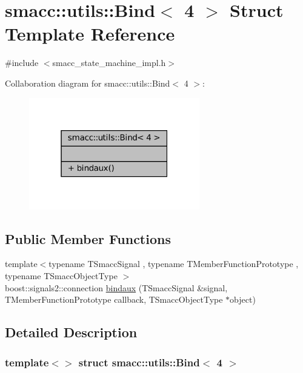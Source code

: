 \hypertarget{structsmacc_1_1utils_1_1Bind_3_014_01_4}{}\section{smacc\+:\+:utils\+:\+:Bind$<$ 4 $>$ Struct Template Reference}
\label{structsmacc_1_1utils_1_1Bind_3_014_01_4}


{\ttfamily \#include $<$smacc\+\_\+state\+\_\+machine\+\_\+impl.\+h$>$}



Collaboration diagram for smacc\+:\+:utils\+:\+:Bind$<$ 4 $>$\+:
\nopagebreak
\begin{figure}[H]
\begin{center}
\leavevmode
\includegraphics[width=211pt]{structsmacc_1_1utils_1_1Bind_3_014_01_4__coll__graph}
\end{center}
\end{figure}
\subsection*{Public Member Functions}
\begin{DoxyCompactItemize}
\item 
{\footnotesize template$<$typename T\+Smacc\+Signal , typename T\+Member\+Function\+Prototype , typename T\+Smacc\+Object\+Type $>$ }\\boost\+::signals2\+::connection \hyperlink{structsmacc_1_1utils_1_1Bind_3_014_01_4_af999b2ea156fad369be761be47f83f18}{bindaux} (T\+Smacc\+Signal \&signal, T\+Member\+Function\+Prototype callback, T\+Smacc\+Object\+Type $\ast$object)
\end{DoxyCompactItemize}


\subsection{Detailed Description}
\subsubsection*{template$<$$>$\newline
struct smacc\+::utils\+::\+Bind$<$ 4 $>$}



